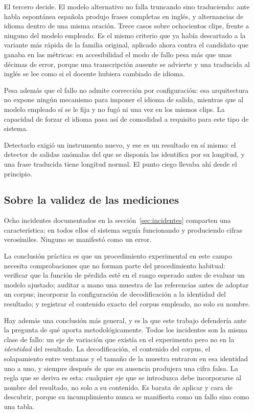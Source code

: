 El tercero decide. El modelo alternativo no falla truncando sino traduciendo: ante habla
espontánea española produjo frases completas en inglés, y alternancias de idioma dentro de
una misma oración. Trece casos sobre ochocientos clips, frente a ninguno del modelo
empleado. Es el mismo criterio que ya había descartado a la variante más rápida de la
familia original, aplicado ahora contra el candidato que ganaba en las métricas: en
accesibilidad el modo de fallo pesa más que unas décimas de error, porque una transcripción
ausente se advierte y una traducida al inglés se lee como si el docente hubiera cambiado de
idioma.

Pesa además que el fallo no admite corrección por configuración: esa arquitectura no expone
ningún mecanismo para imponer el idioma de salida, mientras que al modelo empleado sí se le
fija y no fugó ni una vez en los mismos clips. La capacidad de forzar el idioma pasa así de
comodidad a requisito para este tipo de sistema.

Detectarlo exigió un instrumento nuevo, y ese es un resultado en sí mismo: el detector de
salidas anómalas del que se disponía las identifica por su longitud, y una frase traducida
tiene longitud normal. El punto ciego llevaba ahí desde el principio.

\subsection{Sobre la validez de las mediciones}

Ocho incidentes documentados en la sección~\ref{sec:incidentes} comparten una
característica: en todos ellos el sistema seguía funcionando y produciendo cifras
verosímiles. Ninguno se manifestó como un error.

La conclusión práctica es que un procedimiento experimental en este campo necesita
comprobaciones que no forman parte del procedimiento habitual: verificar que la función de
pérdida esté en el rango esperado antes de evaluar un modelo ajustado; auditar a mano una
muestra de las referencias antes de adoptar un corpus; incorporar la configuración de
decodificación a la identidad del resultado; y registrar el contenido exacto del corpus
empleado, no solo su nombre.

Hay además una conclusión más general, y es la que este trabajo defendería ante la pregunta
de qué aporta metodológicamente. Todos los incidentes son la misma clase de fallo: un eje de
variación que existía en el experimento pero no en la \emph{identidad} del resultado. La
decodificación, el contenido del corpus, el solapamiento entre ventanas y el tamaño de la
muestra entraron en esa identidad uno a uno, y siempre después de que su ausencia produjera
una cifra falsa. La regla que se deriva es esta: cualquier eje que se introduzca debe
incorporarse al nombre del resultado, no solo a su contenido. Es barata de aplicar y cara de
descubrir, porque su incumplimiento nunca se manifiesta como un fallo sino como una tabla.

